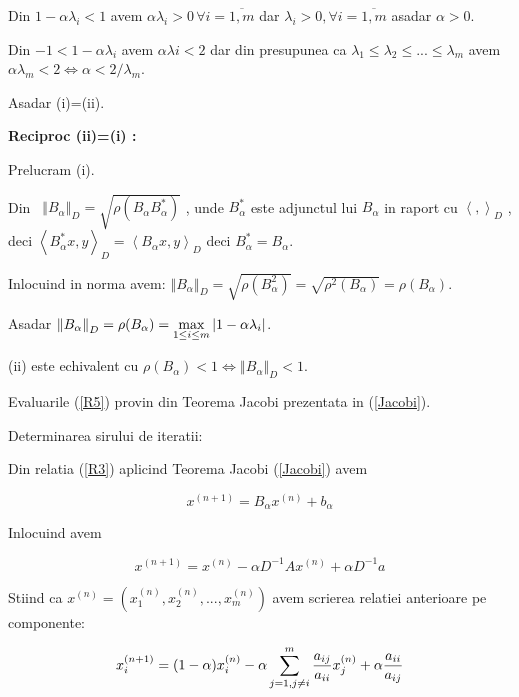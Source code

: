 \documentclass[a4paper,twoside]{book}
\begin{document}
Din $1-\alpha \lambda _{i}<1$ avem $\alpha \lambda _{i}>0\,\forall i=%
\overline{1,m}$ dar $\lambda _{i}>0,\forall i=\overline{1,m}$ asadar $\alpha
>0$.

Din $-1<1-\alpha \lambda _{i}$ avem $\alpha \lambda i<2$ dar din presupunea
ca $\lambda _{1}\leq \lambda _{2}\leq ...\leq \lambda _{m}$ avem $\alpha
\lambda _{m}<2\Leftrightarrow \alpha <2/\lambda _{m}$.

Asadar (i)=\TEXTsymbol{>}(ii).

\textbf{Reciproc (ii)=\TEXTsymbol{>}(i) :}

Prelucram (i).

Din \ $\left\Vert B_{\alpha }\right\Vert _{D}=\sqrt{\rho (B_{\alpha
}B_{\alpha }^{\ast })}$ , unde $B_{\alpha }^{\ast }$ este adjunctul lui $%
B_{\alpha }$ in raport cu $\left\langle ,\right\rangle _{D}$ , deci $%
\left\langle B_{\alpha }^{\ast }x,y\right\rangle _{D}=\left\langle B_{\alpha
}x,y\right\rangle _{D}$ deci $B_{\alpha }^{\ast }=B_{\alpha }$.

Inlocuind in norma avem: $\left\Vert B_{\alpha }\right\Vert _{D}=\sqrt{\rho
(B_{\alpha }^{2})}=\sqrt{\rho ^{2}(B_{\alpha })}=\rho (B_{\alpha })$.

Asadar $\left\Vert B_{\alpha }\right\Vert _{D}=\rho (B_{\alpha })=\underset{%
1\leq i\leq m}{\max }\left\vert 1-\alpha \lambda _{i}\right\vert $.

(ii) este echivalent cu $\rho (B_{\alpha })<1\Leftrightarrow \left\Vert
B_{\alpha }\right\Vert _{D}<1$.

Evaluarile (\ref{R5}) provin din Teorema Jacobi prezentata in (\ref{Jacobi}).

Determinarea sirului de iteratii:

Din relatia (\ref{R3}) aplicind Teorema Jacobi (\ref{Jacobi}) avem

\begin{equation*}
x^{(n+1)}=B_{\alpha }x^{(n)}+b_{\alpha }
\end{equation*}

Inlocuind avem

\begin{equation*}
x^{(n+1)}=x^{(n)}-\alpha D^{-1}Ax^{(n)}+\alpha D^{-1}a
\end{equation*}

Stiind ca $x^{(n)}=(x_{1}^{(n)},x_{2}^{(n)},...,x_{m}^{(n)})$ avem scrierea
relatiei anterioare pe componente:

\begin{equation*}
x_{i}^{(n+1)}=(1-\alpha )x_{i}^{(n)}-\alpha \sum_{j=1,j\neq i}^{m}\frac{%
a_{ij}}{a_{ii}}x_{j}^{(n)}+\alpha \frac{a_{ii}}{a_{ij}}
\end{equation*}
\end{document}
